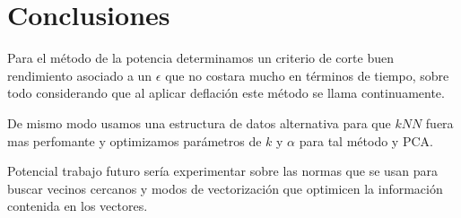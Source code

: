 \section{Conclusiones}%

Para el método de la potencia determinamos un criterio de corte buen rendimiento asociado a un $\epsilon$ que no costara mucho en términos de tiempo, sobre todo considerando que al aplicar deflación este método se llama continuamente.

De mismo modo usamos una estructura de datos alternativa para que $kNN$ fuera mas perfomante y optimizamos parámetros de $k$ y $\alpha$ para tal método y PCA.

Potencial trabajo futuro sería experimentar sobre las normas que se usan para buscar vecinos cercanos y modos de vectorización que optimicen la información contenida en los vectores. 
\label{sec:conclusiones}
